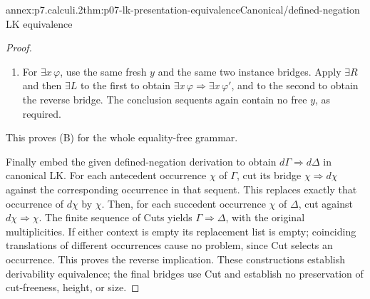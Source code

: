 \begin{annexitem}{annex:p7.calculi.2}{thm:p07-lk-presentation-equivalence}{Canonical/defined-negation LK equivalence}
\begin{proof}
\begin{enumerate}
      from \(\varphi\) and distinct from \(x\).  The formula
      \(\varphi[y/x]\) has smaller complexity than
      \(\forall x\,\varphi\).  Its two induction hypotheses, with
      (D), are
      \[
       \varphi[y/x]\Rightarrow\varphi'[y/x],
       \qquad \varphi'[y/x]\Rightarrow\varphi[y/x].
      \]
      Apply \(\forall L\) and then \(\forall R\) to the first,
      obtaining \(\forall x\,\varphi\Rightarrow\forall x\,\varphi'\).
      On the second, \(\forall L\) gives
      \(\forall x\,\varphi'\Rightarrow\varphi[y/x]\), and
      \(\forall R\) gives the reverse bridge.  Freshness follows from
      the choice of \(y\) and (D).
\item For \(\exists x\,\varphi\), use the same fresh \(y\) and
      the same two instance bridges.  Apply \(\exists R\) and then
      \(\exists L\) to the first to obtain
      \(\exists x\,\varphi\Rightarrow\exists x\,\varphi'\),
      and to the second to obtain the reverse bridge.  The conclusion
      sequents again contain no free \(y\), as required.
\end{enumerate}
This proves (B) for the whole equality-free grammar.

Finally embed the given defined-negation derivation to obtain
\(d\Gamma\Rightarrow d\Delta\) in canonical LK.  For each antecedent
occurrence \(\chi\) of \(\Gamma\), cut its bridge
\(\chi\Rightarrow d\chi\) against the corresponding occurrence in
that sequent.  This replaces exactly that occurrence of \(d\chi\) by
\(\chi\).  Then, for each succedent occurrence \(\chi\) of
\(\Delta\), cut against \(d\chi\Rightarrow\chi\).  The finite
sequence of Cuts yields \(\Gamma\Rightarrow\Delta\), with the original
multiplicities.  If either context is empty its replacement list is empty;
coinciding translations of different occurrences cause no problem, since
Cut selects an occurrence.  This proves the reverse implication.  These
constructions establish derivability equivalence; the final bridges use
Cut and establish no preservation of cut-freeness, height, or size.
\end{proof}
\end{annexitem}

